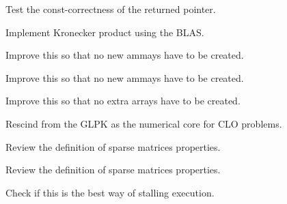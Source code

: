 
\begin{DoxyRefList}
\item[\label{todo__todo000001}%
\hypertarget{todo__todo000001}{}%
Member \hyperlink{classmtk_1_1DenseMatrix_a16b3ff56feb2658b9fc7147d1de4d8e7}{mtk\+:\+:Dense\+Matrix\+:\+:data} () const ]Test the const-\/correctness of the returned pointer.  
\item[\label{todo__todo000002}%
\hypertarget{todo__todo000002}{}%
Member \hyperlink{classmtk_1_1DenseMatrix_a01d3d8bd502870f93bf3a88a0cc5fb49}{mtk\+:\+:Dense\+Matrix\+:\+:Kron} (const Dense\+Matrix \&aa, const Dense\+Matrix \&bb)]Implement Kronecker product using the B\+L\+A\+S.  
\item[\label{todo__todo000015}%
\hypertarget{todo__todo000015}{}%
Member \hyperlink{classmtk_1_1DenseMatrix_a59b9bea24acf39dca64e8549b3527463}{mtk\+:\+:Dense\+Matrix\+:\+:Order\+Col\+Major} ()]Improve this so that no new ammays have to be created.  
\item[\label{todo__todo000014}%
\hypertarget{todo__todo000014}{}%
Member \hyperlink{classmtk_1_1DenseMatrix_ac2949efba3e8278335d45418c85433e4}{mtk\+:\+:Dense\+Matrix\+:\+:Order\+Row\+Major} ()]Improve this so that no new ammays have to be created.  
\item[\label{todo__todo000013}%
\hypertarget{todo__todo000013}{}%
Member \hyperlink{classmtk_1_1DenseMatrix_a71d9c07ca66e88d97d1fd5012f43138b}{mtk\+:\+:Dense\+Matrix\+:\+:Transpose} ()]Improve this so that no extra arrays have to be created.  
\item[\label{todo__todo000003}%
\hypertarget{todo__todo000003}{}%
Class \hyperlink{classmtk_1_1GLPKAdapter}{mtk\+:\+:G\+L\+P\+K\+Adapter} ]Rescind from the G\+L\+P\+K as the numerical core for C\+L\+O problems.  
\item[\label{todo__todo000022}%
\hypertarget{todo__todo000022}{}%
Member \hyperlink{classmtk_1_1Matrix_ac96dd5f31ebcd4388352577487cd6f11}{mtk\+:\+:Matrix\+:\+:Increase\+Num\+Null} ()]Review the definition of sparse matrices properties.  
\item[\label{todo__todo000021}%
\hypertarget{todo__todo000021}{}%
Member \hyperlink{classmtk_1_1Matrix_a2e7c4b84d0cbf9b0122b5dc906ad1eae}{mtk\+:\+:Matrix\+:\+:Increase\+Num\+Zero} ()]Review the definition of sparse matrices properties.  
\item[\label{todo__todo000023}%
\hypertarget{todo__todo000023}{}%
Member \hyperlink{classmtk_1_1Tools_afe5bb096309258e2e72503fd7b41c7e0}{mtk\+:\+:Tools\+:\+:Prevent} (const bool complement, const char $\ast$fname, int lineno, const char $\ast$fxname)]Check if this is the best way of stalling execution.  

\end{DoxyRefList}
